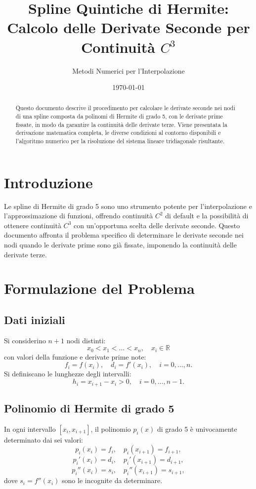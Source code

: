 \documentclass[12pt]{article}
\title{\textbf{Spline Quintiche di Hermite: \\ Calcolo delle Derivate Seconde per Continuità $C^3$}}
\author{Metodi Numerici per l'Interpolazione}
\date{\today}
\newcommand{\R}{\mathbb{R}}
\begin{document}
\maketitle

\begin{abstract}
Questo documento descrive il procedimento per calcolare le derivate seconde nei nodi di una spline composta da polinomi di Hermite di grado 5, con le derivate prime fissate, in modo da garantire la continuità delle derivate terze. Viene presentata la derivazione matematica completa, le diverse condizioni al contorno disponibili e l'algoritmo numerico per la risoluzione del sistema lineare tridiagonale risultante.
\end{abstract}

\tableofcontents

\section{Introduzione}
Le spline di Hermite di grado 5 sono uno strumento potente per l'interpolazione e l'approssimazione di funzioni, offrendo continuità $C^2$ di default e la possibilità di ottenere continuità $C^3$ con un'opportuna scelta delle derivate seconde. Questo documento affronta il problema specifico di determinare le derivate seconde nei nodi quando le derivate prime sono già fissate, imponendo la continuità delle derivate terze.

\section{Formulazione del Problema}

\subsection{Dati iniziali}
Si considerino $n+1$ nodi distinti:
\[
x_0 < x_1 < \dots < x_n, \quad x_i \in \R
\]
con valori della funzione e derivate prime note:
\[
f_i = f(x_i), \quad d_i = f'(x_i), \quad i = 0,\dots,n.
\]
Si definiscano le lunghezze degli intervalli:
\[
h_i = x_{i+1} - x_i > 0, \quad i = 0,\dots,n-1.
\]

\subsection{Polinomio di Hermite di grado 5}
In ogni intervallo $[x_i, x_{i+1}]$, il polinomio $p_i(x)$ di grado 5 è univocamente determinato dai sei valori:
\[
p_i(x_i) = f_i,\quad p_i(x_{i+1}) = f_{i+1},
\]
\[
p_i'(x_i) = d_i,\quad p_i'(x_{i+1}) = d_{i+1},
\]
\[
p_i''(x_i) = s_i,\quad p_i''(x_{i+1}) = s_{i+1},
\]
dove $s_i = f''(x_i)$ sono le incognite da determinare.
\end{document}
